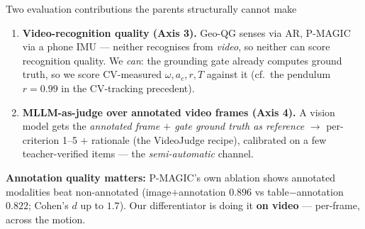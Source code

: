\documentclass[aspectratio=169,10pt]{beamer}
\begin{document}
\begin{frame}{Two evaluation contributions the parents structurally cannot make}
\small
\begin{enumerate}\setlength\itemsep{4pt}
  \item \textbf{\color{cApp}Video-recognition quality (Axis 3).} Geo-QG senses via AR, P-MAGIC via a
  phone IMU --- neither recognises from \emph{video}, so neither can score recognition quality. We
  \emph{can}: the grounding gate already computes ground truth, so we score CV-measured
  $\omega, a_c, r, T$ against it (cf.\ the pendulum $r=0.99$ in the CV-tracking precedent).
  \item \textbf{\color{cInfra}MLLM-as-judge over annotated video frames (Axis 4).} A vision model gets
  the \emph{annotated frame $+$ gate ground truth as reference} $\to$ per-criterion 1--5 $+$ rationale
  (the VideoJudge recipe), calibrated on a few teacher-verified items --- the \emph{semi-automatic} channel.
\end{enumerate}
\vspace{0.3em}
\begin{tcolorbox}[colback=cPed!6,colframe=cPed,boxsep=2pt,left=4pt,right=4pt]
\scriptsize \textbf{Annotation quality matters:} P-MAGIC's own ablation shows annotated modalities
beat non-annotated (image$+$annotation $0.896$ vs table$-$annotation $0.822$; Cohen's $d$ up to $1.7$).
Our differentiator is doing it \textbf{on video} --- per-frame, across the motion.
\end{tcolorbox}
\end{frame}
\end{document}
